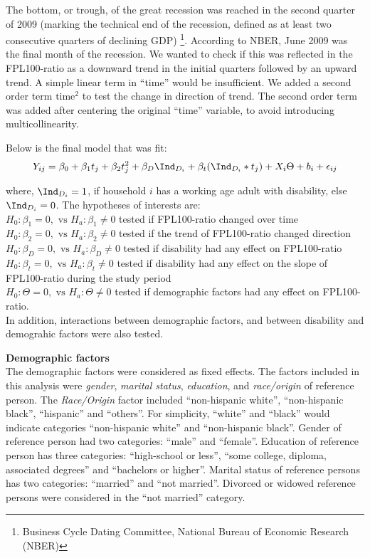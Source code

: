 \documentclass[11pt]{extarticle} %
\begin{document}
The bottom, or trough, of the great recession was reached in the second quarter of 2009 (marking the technical end of the recession, defined as at least two consecutive quarters of declining GDP) \footnote{Business Cycle Dating Committee, National Bureau of Economic Research (NBER)}. According to NBER, June 2009 was the final month of the recession. We wanted to check if this was reflected in the FPL100-ratio as a downward trend in the initial quarters followed by an upward trend. A simple linear term in ``time'' would be insufficient. We added a second order term $\text{time}^2$ to test the change in direction of trend. The second order term was added after centering the original ``time'' variable, to avoid introducing multicollinearity. 

Below is the final model that was fit: 
\vspace{-0.5cm}
\begin{equation}
Y_{ij} = \beta_0 + \beta_1 t_j + \beta_2 t_j^2 + \beta_D \Ind_{D_i} + \beta_t(\Ind_{D_i}*t_j) + X_i\Theta + b_i + \epsilon_{ij}
\label{eq:MixedEffects2}
\end{equation}

where, $\Ind_{D_i} = 1$, if household $i$ has a working age adult with disability, else $\Ind_{D_i} = 0$. The hypotheses of interests are: \\
$H_0: \beta_1 = 0, \text{  vs  } H_a: \beta_1 \ne 0$ tested if FPL100-ratio changed over time \\
$H_0: \beta_2 = 0, \text{  vs  } H_a: \beta_2 \ne 0$ tested if the trend of FPL100-ratio changed direction \\
$H_0: \beta_D = 0, \text{  vs  } H_a: \beta_D \ne 0$ tested if disability had any effect on FPL100-ratio\\
$H_0: \beta_t = 0, \text{  vs  } H_a: \beta_t \ne 0$ tested if disability had any effect on the slope of FPL100-ratio during the study period\\
$H_0: \Theta = 0, \text{  vs  } H_a: \Theta \ne 0$ tested if demographic factors had any effect on FPL100-ratio. \\
In addition, interactions between demographic factors, and between disability and demograhic factors were also tested. 

\noindent
{\bf{Demographic factors}}\\
The demographic factors were considered as fixed effects. The factors included in this analysis were {\emph{gender}}, {\emph{marital status}}, {\emph{education}}, and {\emph{race/origin}} of reference person. The {\emph{Race/Origin}} factor included ``non-hispanic white'', ``non-hispanic black'', ``hispanic'' and ``others''. For simplicity, ``white'' and ``black'' would indicate categories ``non-hispanic white'' and ``non-hispanic black''. Gender of reference person had two categories: ``male'' and ``female''. Education of reference person has three categories: ``high-school or less'', ``some college, diploma, associated degrees'' and ``bachelors or higher''. Marital status of reference persons has two categories: ``married'' and ``not married''. Divorced or widowed reference persons were considered in the ``not married'' category.\\
\end{document}
